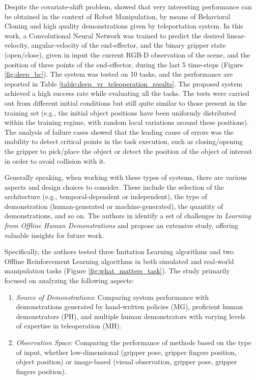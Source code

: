 Despite the covariate-shift problem, \cite{zhang2018deep_vr_teleoperation} showed that very interesting performance can be obtained in the context of Robot Manipulation, by means of Behavioral Cloning and high quality demonstrations given by teleportation system. In this work, a Convolutional Neural Network was trained to predict the desired linear-velocity, angular-velocity of the end-effector, and the binary gripper state (open/close), given in input the current RGB-D observation of the scene, and the position of three points of the end-effector, during the last 5 time-steps (Figure \ref{fig:deep_bc}). The system was tested on 10 tasks, and the performance are reported in Table \ref{table:deep_vr_teleoperation_results}. The proposed system achieved a high success rate while evaluating all the tasks. The tests were carried out from different initial conditions but still quite similar to those present in the training set (e.g., the initial object positions have been uniformly distributed within the training regime, with random local variations around these positions). The analysis of failure cases showed that the leading cause of errors was the inability to detect critical points in the task execution, such as closing/opening the gripper to pick/place the object or detect the position of the object of interest in order to avoid collision with it.


Generally speaking, when working with these types of systems, there are various aspects and design choices to consider. These include the selection of the architecture (e.g., temporal-dependent or independent), the type of demonstration (human-generated or machine-generated), the quantity of demonstrations, and so on. The authors in \cite{mandlekar2022matters} identify a set of challenges in \textit{Learning from Offline Human Demonstrations} and propose an extensive study, offering valuable insights for future work.

Specifically, the authors tested three Imitation Learning algorithms and two Offline Reinforcement Learning algorithms in both simulated and real-world manipulation tasks (Figure \ref{fig:what_matters_task}). The study primarily focused on analyzing the following aspects:

\begin{enumerate}
    \item \textit{Source of Demonstrations}: Comparing system performance with demonstrations generated by hand-written policies (MG), proficient human demonstrators (PH), and multiple human demonstrators with varying levels of expertise in teleoperation (MH).
    \item \textit{Observation Space}: Comparing the performance of methods based on the type of input, whether low-dimensional (gripper pose, gripper fingers position, object position) or image-based (visual observation, gripper pose, gripper fingers position).
\end{enumerate}


